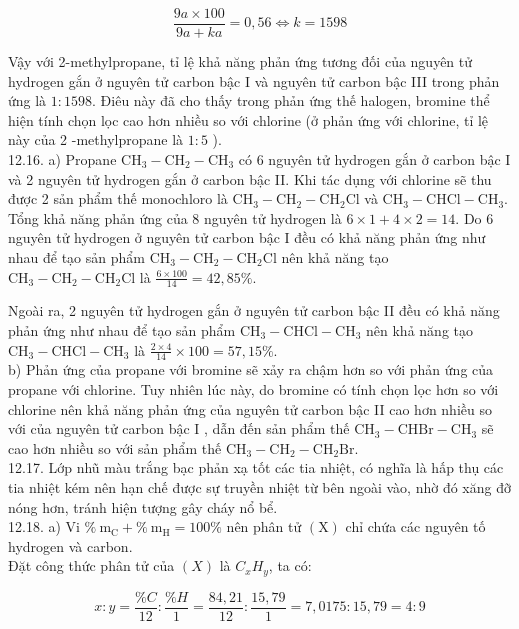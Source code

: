 \documentclass[10pt]{article}
\begin{document}
$$
\frac{9 a \times 100}{9 a+k a}=0,56 \Leftrightarrow k=1598
$$

Vậy với 2-methylpropane, tỉ lệ khả năng phản ứng tương đối của nguyên tử hydrogen gắn ở nguyên tử carbon bậc I và nguyên tử carbon bậc III trong phản ứng là $1: 1598$. Điêu này đã cho thấy trong phản ứng thế halogen, bromine thể hiện tính chọn lọc cao hơn nhiều so với chlorine (ở phản ứng với chlorine, tỉ lệ này của 2 -methylpropane là $1: 5$ ).\\
12.16. a) Propane $\mathrm{CH}_{3}-\mathrm{CH}_{2}-\mathrm{CH}_{3}$ có 6 nguyên tử hydrogen gắn ở carbon bậc I và 2 nguyên tử hydrogen gắn ở carbon bậc II. Khi tác dụng với chlorine sẽ thu được 2 sản phẩm thế monochloro là $\mathrm{CH}_{3}-\mathrm{CH}_{2}-\mathrm{CH}_{2} \mathrm{Cl}$ và $\mathrm{CH}_{3}-\mathrm{CHCl}-\mathrm{CH}_{3}$. Tổng khả năng phản ứng của 8 nguyên tử hydrogen là $6 \times 1+4 \times 2=14$. Do 6 nguyên tử hydrogen ở nguyên tử carbon bậc I đều có khả năng phản ứng như nhau để tạo sản phẩm $\mathrm{CH}_{3}-\mathrm{CH}_{2}-\mathrm{CH}_{2} \mathrm{Cl}$ nên khả năng tạo $\mathrm{CH}_{3}-\mathrm{CH}_{2}-\mathrm{CH}_{2} \mathrm{Cl}$ là $\frac{6 \times 100}{14}=42,85 \%$.

Ngoài ra, 2 nguyên tử hydrogen gắn ở nguyên tử carbon bậc II đều có khả năng phản ứng như nhau để tạo sản phẩm $\mathrm{CH}_{3}-\mathrm{CHCl}-\mathrm{CH}_{3}$ nên khả năng tạo $\mathrm{CH}_{3}-\mathrm{CHCl}-\mathrm{CH}_{3}$ là $\frac{2 \times 4}{14} \times 100=57,15 \%$.\\
b) Phản ứng của propane với bromine sẽ xảy ra chậm hơn so với phản ứng của propane với chlorine. Tuy nhiên lúc này, do bromine có tính chọn lọc hơn so với chlorine nên khả năng phản ứng của nguyên tử carbon bậc II cao hơn nhiều so với của nguyên tử carbon bậc I , dẫn đến sản phẩm thế $\mathrm{CH}_{3}-\mathrm{CHBr}-\mathrm{CH}_{3}$ sẽ cao hơn nhiều so với sản phẩm thế $\mathrm{CH}_{3}-\mathrm{CH}_{2}-\mathrm{CH}_{2} \mathrm{Br}$.\\
12.17. Lớp nhũ màu trắng bạc phản xạ tốt các tia nhiệt, có nghĩa là hấp thụ các tia nhiệt kém nên hạn chế được sự truyền nhiệt từ bên ngoài vào, nhờ đó xăng đỡ nóng hơn, tránh hiện tượng gây cháy nổ bể.\\
12.18. a) Vi $\% \mathrm{~m}_{\mathrm{C}}+\% \mathrm{~m}_{\mathrm{H}}=100 \%$ nên phân tử $(\mathrm{X})$ chỉ chứa các nguyên tố hydrogen và carbon.\\
Đặt công thức phân tử của $(X)$ là $C_{x} H_{y}$, ta có:

$$
x: y=\frac{\% C}{12}: \frac{\% H}{1}=\frac{84,21}{12}: \frac{15,79}{1}=7,0175: 15,79=4: 9
$$
\end{document}
